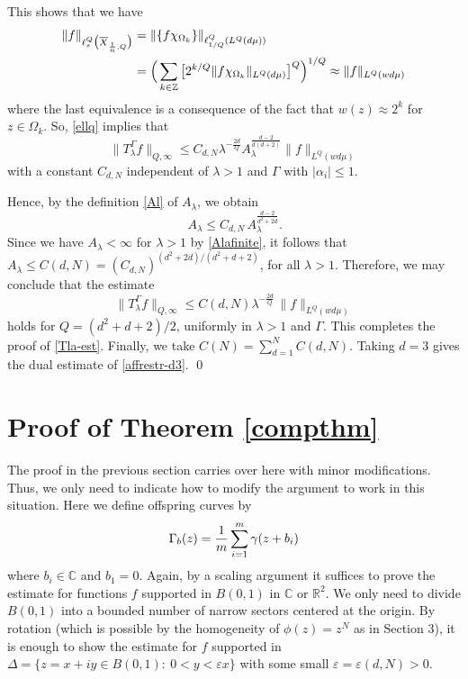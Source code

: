 \documentclass[11 pt]{amsart}
\theoremstyle{plain}
\numberwithin{equation}{section}
\theoremstyle{plain}
\numberwithin{equation}{section}
\theoremstyle{remark}
\begin{document}
This shows that we have
\begin{align*}
 \| f\|_{\ell^{Q}_{s} \big( \overline{X}_{{1\over n}, Q}\big)} &= \| \{f
\chi_{\Omega_k}\} \|_{\ell^Q_{1/Q} (L^Q (d\mu ))} \\
&= \Big(\sum_{k\in {{\mathbb {Z}}}} \big[ 2^{k /Q} \| f
\chi_{\Omega_k}\|_{L^Q(d\mu )} \big]^Q \Big)^{1/Q} \approx \| f\|_{L^Q (w d\mu )}
\end{align*}
where the last equivalence is a consequence of the fact that $w(z) \approx 2^k$ for $z\in \Omega_k$.
So, \eqref{ellq} implies that
\begin{equation*}\label{}
\| T_{\lambda}^{\Gamma} f\|_{Q,\infty} \le C_{d,N} {\lambda}^{-\frac{2 d}{Q}} A_{\lambda}^{\frac{d-2}{d(d+2)}}
\| f\|_{L^{Q}(w d\mu )}
\end{equation*}
with a constant $C_{d,N}$ independent of ${\lambda} >1$ and $\Gamma$ with $|\alpha_i| \le 1$.

Hence, by the definition \eqref{Al} of $A_{\lambda}$, we obtain
\begin{equation*}\label{}
\,A_{\lambda} \le C_{d,N} \, A_{\lambda}^{\frac{d-2}{d^2+2d}} .
\end{equation*}
Since we have $A_{\lambda} < \infty$ for ${\lambda} >1$ by \eqref{Alafinite}, it follows
that $A_{\lambda} \le C(d,N) = (C_{d,N})^{ (d^2 + 2d) / (d^2 + d +2)}$, for all
${\lambda} >1$. Therefore, we may conclude that the estimate
\begin{equation*}\label{}
\| T_{\lambda}^{\Gamma} f\|_{Q,\infty} \le  C(d,N) {\lambda}^{-\frac{2 d}{Q}} \,
 \| f\|_{L^{Q}(w d\mu )}
\end{equation*}
holds for $Q= (d^2 + d +2) /2$, uniformly in ${\lambda} >1$ and $\Gamma$. This completes the proof of \eqref{Tla-est}. Finally, we take $C(N) = \sum_{d=1}^N C(d,N)$. Taking $d=3$ gives the dual estimate of \eqref{affrestr-d3}. \qed

\section{Proof of Theorem \ref{compthm}}

The proof in the previous section carries over here with minor modifications. Thus, we only need to
indicate how to modify the argument to work in this situation.
Here we define offspring curves by
\[ \Gamma_b(z) = {1\over m} \sum_{i=1}^m \gamma(z+ b_i)
\]
where $b_i \in {{\mathbb {C}}}$ and $b_1 =0$. Again, by a scaling argument it suffices to prove the estimate for functions $f$
supported in $B(0,1)$ in ${{\mathbb {C}}}$ or ${{\mathbb {R}}}^2$.
We only need to divide $B(0,1)$ into a bounded number
of narrow sectors centered at the origin. By rotation (which is possible by
the homogeneity of $\phi(z)=z^N$ as in Section 3), it is enough to show the
estimate for $f$ supported in $\Delta = \{z = x+ iy \in B(0,1) :~
0< y < \varepsilon x \}$ with some small $\varepsilon = \varepsilon(d, N) >0$.
\end{document}
